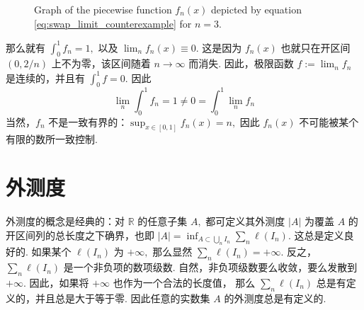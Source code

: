 \documentclass[12pt, a4paper, oneside]{book}
\numberwithin{figure}{section}
\theoremstyle{definition}
\begin{document}
\begin{figure}[]
    \centering
    \caption{Graph of the piecewise function \( f_n(x) \) depicted by equation \eqref{eq:swap_limit_counterexample} for \( n=3 \).}
    \label{fig:fn}
\end{figure}

那么就有 $\int_0^1 f_n = 1,$ 以及 $\lim_n f_n(x)\equiv 0.$ 这是因为 $f_n(x)$ 也就只在开区间 $(0,2/n)$ 上不为零，该区间随着 $n\to\infty$ 而消失.
因此，极限函数 $f:=\lim_n f_n$ 是连续的，并且有 $\int_0^1 f=0.$ 因此
\begin{equation}
    \lim_n \int_0^1 f_n = 1\neq 0=\int_0^1 \lim_n f_n
\end{equation}
当然，$f_n$ 不是一致有界的：$\sup_{x\in [0,1]}f_n(x)=n,$ 因此 $f_n(x)$ 不可能被某个有限的数所一致控制.


\section{外测度} 外测度的概念是经典的：对 $\mathbb R$ 的任意子集 $A,$ 都可定义其外测度 $|A|$ 为覆盖 $A$ 的开区间列的总长度之下确界，也即 $|A|=\inf_{A\subset\bigcup_n I_n} \sum_n \ell(I_n).$
这总是定义良好的. 如果某个 $\ell(I_n)$ 为 $+\infty,$ 那么显然 $\sum_n \ell(I_n)=+\infty.$ 反之，$\sum_n \ell(I_n)$ 是一个非负项的数项级数. 
自然，非负项级数要么收敛，要么发散到 $+\infty.$ 因此，如果将 $+\infty$ 也作为一个合法的长度值，
那么 $\sum_n \ell(I_n)$ 总是有定义的，并且总是大于等于零. 因此任意的实数集 $A$ 的外测度总是有定义的.
\end{document}
